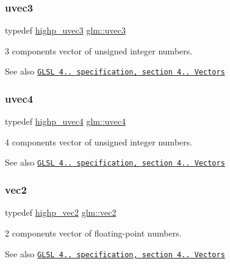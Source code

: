 \subsubsection{\texorpdfstring{uvec3}{uvec3}}
{\footnotesize\ttfamily typedef \hyperlink{group__core__precision_ga90ab9c4694f5af23c7dcd4eb9e47e255}{highp\+\_\+uvec3} \hyperlink{group__core__types_gac4ba593917841b859ba1683b8b52b8fa}{glm\+::uvec3}}

3 components vector of unsigned integer numbers.

\begin{DoxySeeAlso}{See also}
\href{http://www.opengl.org/registry/doc/GLSLangSpec.4.20.8.pdf}{\tt G\+L\+SL 4.. specification, section 4.. Vectors} 
\end{DoxySeeAlso}
\mbox{\label{group__core__types_ga1c426d19627b32b14f0089f7f4ba7b1d}} 
\subsubsection{\texorpdfstring{uvec4}{uvec4}}
{\footnotesize\ttfamily typedef \hyperlink{group__core__precision_gaced82ea2e726f079d4d72cf180a75b8b}{highp\+\_\+uvec4} \hyperlink{group__core__types_ga1c426d19627b32b14f0089f7f4ba7b1d}{glm\+::uvec4}}

4 components vector of unsigned integer numbers.

\begin{DoxySeeAlso}{See also}
\href{http://www.opengl.org/registry/doc/GLSLangSpec.4.20.8.pdf}{\tt G\+L\+SL 4.. specification, section 4.. Vectors} 
\end{DoxySeeAlso}
\mbox{\label{group__core__types_gaa1618f51db67eaa145db101d8c8431d8}} 
\subsubsection{\texorpdfstring{vec2}{vec2}}
{\footnotesize\ttfamily typedef \hyperlink{group__core__precision_ga84532f0e0c7e2af99edd65dc182aba51}{highp\+\_\+vec2} \hyperlink{group__core__types_gaa1618f51db67eaa145db101d8c8431d8}{glm\+::vec2}}

2 components vector of floating-\/point numbers.

\begin{DoxySeeAlso}{See also}
\href{http://www.opengl.org/registry/doc/GLSLangSpec.4.20.8.pdf}{\tt G\+L\+SL 4.. specification, section 4.. Vectors} 
\end{DoxySeeAlso}
\mbox{\label{group__core__types_ga1c47e8b3386109bc992b6c48e91b0be7}} 
